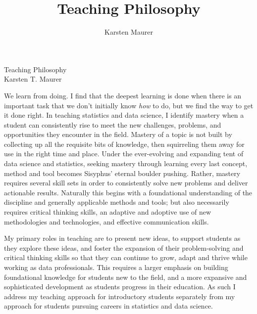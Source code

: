 \documentclass[letterpaper,12pt]{article}\usepackage[]{graphicx}\usepackage[]{color}
\title{Teaching Philosophy}
\author{Karsten Maurer}
\date{}
\begin{document}
\onehalfspacing

\begin{center}
\Large Teaching Philosophy \\
\normalsize Karsten T. Maurer \\
\end{center}

\vspace{.1in}

We learn from doing. I find that the deepest learning is done when there is an important task that we don't initially know {\it how} to do, but we find the way to get it done right. In teaching statistics and data science, I identify mastery when a student can consistently rise to meet the new challenges, problems, and opportunities they encounter in the field. Mastery of a topic is not built by collecting up all the requisite bits of knowledge, then squirreling them away for use in the right time and place. Under the ever-evolving and expanding tent of data science and statistics, seeking mastery through learning every last concept, method and tool becomes Sisyphus' eternal boulder pushing. Rather, mastery requires several skill sets in order to consistently solve new problems and deliver actionable results. Naturally this begins with a foundational understanding of the discipline and generally applicable methods and tools; but also necessarily requires critical thinking skills, an adaptive and adoptive use of new methodologies and technologies, and effective communication skills. 

My primary roles in teaching are to present new ideas, to support students as they explore these ideas, and foster the expansion of their problem-solving and critical thinking skills so that they can continue to grow, adapt and thrive while working as data professionals.  This requires a larger emphasis on building foundational knowledge for students new to the field, and a more expansive and sophisticated development as students progress in their education. As such I address my teaching approach for introductory students separately from my approach for students pursuing careers in statistics and data science. 
\end{document}
